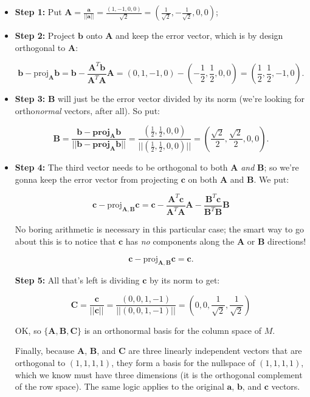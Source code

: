 \documentclass{article}
\begin{document}
\begin{itemize}
    \item \textbf{Step 1:} Put $\mathbf{A} = \frac{\mathbf{a}}{||\mathbf{a}||} = \frac{(1, -1, 0, 0)}{\sqrt{2}} = \left(\frac{1}{\sqrt{2}}, -\frac{1}{\sqrt{2}}, 0, 0\right)$;
    
    \item \textbf{Step 2:} Project $\mathbf{b}$ onto $\mathbf{A}$ and keep the error vector, which is by design orthogonal to $\mathbf{A}$:
    
    \[
    \mathbf{b} - \text{proj}_{\mathbf{A}} \mathbf{b} = \mathbf{b} - \frac{\mathbf{A}^{T}\mathbf{b}}{\mathbf{A}^{T}\mathbf{A}}\mathbf{A} = (0, 1, -1, 0) - \left(-\frac{1}{2}, \frac{1}{2}, 0, 0\right) = \left(\frac{1}{2}, \frac{1}{2}, -1, 0\right).
    \]
    
    \item \textbf{Step 3:} $\mathbf{B}$ will just be the error vector divided by its norm (we're looking for ortho\textit{normal} vectors, after all). So put:
    
    \[
    \mathbf{B} = \frac{\mathbf{b - \text{proj}_{\mathbf{A}}\mathbf{b}}}{||\mathbf{b - \text{proj}_{\mathbf{A}}\mathbf{b}}||} = \frac{\left(\frac{1}{2}, \frac{1}{2}, 0, 0\right)}{||\left(\frac{1}{2}, \frac{1}{2}, 0, 0\right)||} = \left(\frac{\sqrt{2}}{2}, \frac{\sqrt{2}}{2}, 0, 0\right).
    \]
    
    \item \textbf{Step 4:} The third vector needs to be orthogonal to both $\mathbf{A}$ \textit{and} $\mathbf{B}$; so we're gonna keep the error vector from projecting $\mathbf{c}$ on both $\mathbf{A}$ and $\mathbf{B}$. We put:
    
    \[
    \mathbf{c} - \text{proj}_{\mathbf{A, B}} \mathbf{c} = \mathbf{c} - \frac{\mathbf{A}^{T}\mathbf{c}}{\mathbf{A}^{T}\mathbf{A}}\mathbf{A} - \frac{\mathbf{B}^{T}\mathbf{c}}{\mathbf{B}^{T}\mathbf{B}}\mathbf{B}
    \]
    
    No boring arithmetic is necessary in this particular case; the smart way to go about this is to notice that $\mathbf{c}$ has \textit{no} components along the $\mathbf{A}$ or $\mathbf{B}$ directions!
    
    \[
    \mathbf{c} - \text{proj}_{\mathbf{A, B}} \mathbf{c} = \mathbf{c}.
    \]
    
    \noindent \textbf{Step 5:} All that's left is dividing $\mathbf{c}$ by its norm to get:
    
    \[
    \mathbf{C} = \frac{\mathbf{c}}{||\mathbf{c}||} = \frac{(0, 0, 1, -1)}{||(0, 0, 1, -1)||} = \left(0, 0, \frac{1}{\sqrt{2}}, \frac{1}{\sqrt{2}}\right)
    \]
    
    OK, so $\{\mathbf{A}, \mathbf{B}, \mathbf{C}\}$ is an orthonormal basis for the column space of $M$.
    
    Finally, because $\mathbf{A}$, $\mathbf{B}$, and $\mathbf{C}$ are three linearly independent vectors that are orthogonal to $(1, 1, 1, 1)$, they form a basis for the nullspace of $(1, 1, 1, 1)$, which we know must have three dimensions (it is the orthogonal complement of the row space). The same logic applies to the original $\mathbf{a}$, $\mathbf{b}$, and $\mathbf{c}$ vectors.
\end{itemize}
\end{document}
